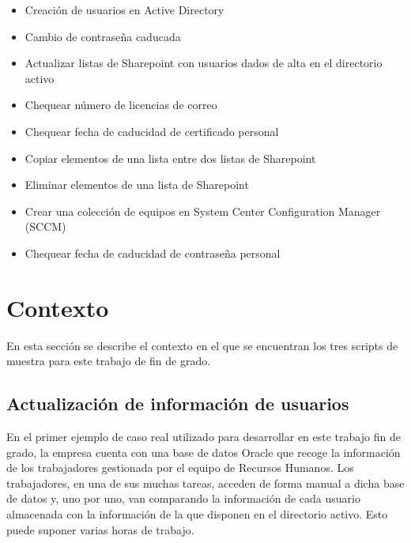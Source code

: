 \documentclass[a4paper, 12pt]{book}
\begin{document}
\begin{itemize}
\item Creación de usuarios en Active Directory

\item Cambio de contraseña caducada

\item Actualizar listas de Sharepoint con usuarios dados de alta en el directorio activo

\item Chequear número de licencias de correo

\item Chequear fecha de caducidad de certificado personal

\item Copiar elementos de una lista entre dos listas de Sharepoint

\item Eliminar elementos de una lista de Sharepoint

\item Crear una colección de equipos en System Center Configuration Manager (SCCM)

\item Chequear fecha de caducidad de contraseña personal
\end{itemize}


\section{Contexto}
\label{sec:contexto}

En esta sección se describe el contexto en el que se encuentran los tres scripts de muestra para este trabajo de fin de grado.

\subsection{Actualización de información de usuarios}
\label{subsec:Actualización de información de usuarios}

En el primer ejemplo de caso real utilizado para desarrollar en este trabajo fin de grado, la empresa cuenta con una base de datos Oracle que recoge la información de los trabajadores gestionada por el equipo de Recursos Humanos. Los trabajadores, en una de sus muchas tareas, acceden de forma manual a dicha base de datos y, uno por uno, van comparando la información de cada usuario almacenada con la información de la que disponen en el directorio activo. Esto puede suponer varias horas de trabajo.
\\
\end{document}
